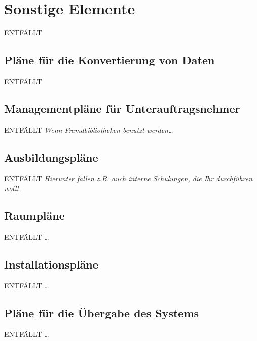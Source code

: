 \documentclass[fontsize=12pt,paper=a4,twoside]{scrartcl}
\begin{document}
\section{Sonstige Elemente}
ENTFÄLLT
\subsection{Pläne für die Konvertierung von Daten}
ENTFÄLLT

\subsection{Managementpläne für Unterauftragsnehmer}
ENTFÄLLT
{\em Wenn Fremdbibliotheken benutzt werden\dots}

\subsection{Ausbildungspläne}
ENTFÄLLT
{\em Hierunter fallen z.B. auch interne Schulungen, die Ihr
  durchführen wollt.}

\subsection{Raumpläne}
ENTFÄLLT
\dots

\subsection{Installationspläne}
ENTFÄLLT
\dots

\subsection{Pläne für die Übergabe des Systems}
ENTFÄLLT
\dots
\end{document}
